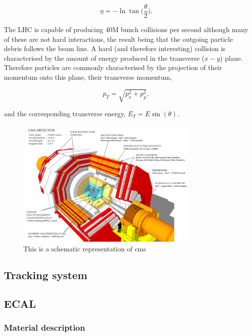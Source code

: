 \begin{equation}
	\eta = -\ln\tan\biggl(\frac{\theta}{2}\biggr).
\end{equation}

The LHC is capable of producing 40M bunch collisions per second although many of these are not hard interactions, the result being that the outgoing particle debris follows the beam line. A hard (and therefore interesting) collision is characterised by the amount of energy produced in the transverse ($x-y$) plane. Therefore particles are commonly characterised by the projection of their momentum onto this plane, their transverse momentum,

\begin{equation}
	p_{T} = \sqrt{p_{x}^{2}+p_{y}^{2}},
\end{equation}

and the corresponding transverse energy, $E_{T} = E\sin(\theta)$.

\begin{figure}
  \includegraphics[width=0.8\textwidth]{ch2_cms_exp/plots/cms_diagram.png}
  \caption[CMS diagram]{This is a schematic representation of \ac{cms}}
  \label{fig:cms_diagram}
\end{figure}

\subsection{Tracking system}



\subsection{ECAL}

\subsubsection{Material description}

